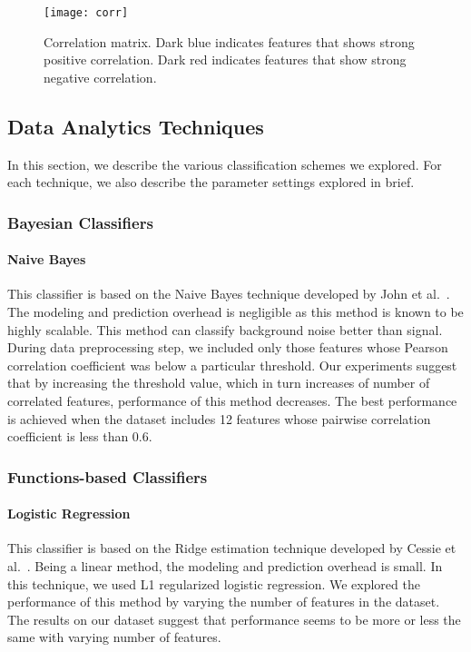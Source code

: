 \begin{figure}[h]
\centering
\texttt{[image: corr]}
\caption{Correlation matrix. Dark blue indicates features that shows strong positive correlation. Dark red indicates features that show strong negative correlation.}
\label{fig:correlation-matrix}
\end{figure}



\subsection{Data Analytics Techniques}

In this section, we describe the various classification schemes we explored. For each technique, we also describe the parameter settings explored in brief.


\subsubsection{Bayesian Classifiers}

\paragraph{Naive Bayes}

This classifier is based on the Naive Bayes technique developed by John et al.~\cite{NaiveBayes}. The modeling and prediction overhead is negligible as this method is known to be highly scalable. This method can classify background noise better than signal. During data preprocessing step, we included only those features whose Pearson correlation coefficient was below a particular threshold. Our experiments suggest that by increasing the threshold value, which in turn increases of number of correlated features, performance of this method decreases. The best performance is achieved when the dataset includes 12 features whose pairwise correlation coefficient is less than 0.6.	

\subsubsection{Functions-based Classifiers}

\paragraph{Logistic Regression}

This classifier is based on the Ridge estimation technique developed by Cessie et al.~\cite{Logistic Regression}. Being a linear method, the modeling and prediction overhead is small. In this technique, we used L1 regularized logistic regression. We explored the performance of this method
by varying the number of features in the dataset. The results on our dataset suggest that performance seems to be more or less the same with varying number of features.


